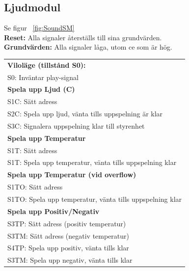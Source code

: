 \documentclass[a4paper,11pt]{article}
\begin{document}
\pagebreak

		\subsection{Ljudmodul}

			Se figur ~\ref{fig:SoundSM}\\
			{\bf Reset:} Alla signaler återställs till sina grundvärden.\\
			{\bf Grundvärden:} Alla signaler låga, utom ce som är hög.\\
			\begin{tabular}{l}
				\\{\bf Viloläge (tillstånd S0):}\\
				S0: Inväntar play-signal\\
				{\bf Spela upp Ljud (C)}\\
				S1C: Sätt adress\\
				S2C: Spela upp ljud, vänta tills uppspelning är klar\\
				S3C: Signalera uppspelning klar till styrenhet\\
				{\bf Spela upp Temperatur}\\
				S1T: Sätt adress\\
				S1T: Spela upp temperatur, vänta tills uppspelning klar\\
				{\bf Spela upp Temperatur (vid overflow)}\\
				S1TO: Sätt adress\\
				S1TO: Spela upp temperatur, vänta tills uppspelning klar\\
				{\bf Spela upp Positiv/Negativ}\\
				S3TP: Sätt adress (positiv temperatur)\\
				S3TM: Sätt adress (negativ temperatur)\\
				S4TP: Spela upp positiv, vänta tills klar\\
				S3TM: Spela upp negativ, vänta tills klar\\
			\end{tabular}
\end{document}
